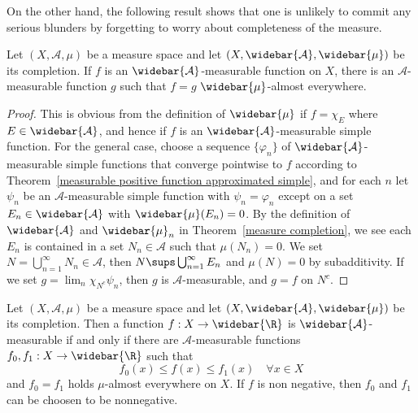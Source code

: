 On the other hand, the following result shows that one is unlikely to commit any serious blunders by forgetting to worry about completeness of the measure.
\begin{proposition}\label{measurable function completion}
Let $(X,\mathcal{A},\mu)$ be a measure space and let $(X,\widebar{\mathcal{A}},\widebar{\mu})$ be its completion. If $f$ is an $\widebar{\mathcal{A}}$-measurable function on $X$, there is an $\mathcal{A}$-measurable function
$g$ such that $f=g$ $\widebar{\mu}$-almost everywhere.
\end{proposition}
\begin{proof}
This is obvious from the definition of $\widebar{\mu}$ if $f=\chi_E$ where $E\in\widebar{\mathcal{A}}$, and hence if $f$ is an $\widebar{\mathcal{A}}$-measurable simple function. For the general case, choose a sequence $\{\varphi_n\}$ of $\widebar{\mathcal{A}}$-measurable simple functions that converge pointwise to $f$ according to Theorem~\ref{measurable positive function approximated simple}, and for each $n$ let $\psi_n$ be an $\mathcal{A}$-measurable simple function with $\psi_n=\varphi_n$ except on a set $E_n\in\widebar{\mathcal{A}}$ with $\widebar{\mu}(E_n)=0$. By the definition of $\widebar{\mathcal{A}}$ and $\widebar{\mu}_n$ in Theorem~\ref{measure completion}, we see each $E_n$ is contained in a set $N_n\in\mathcal{A}$ such that $\mu(N_n)=0$. We set $N=\bigcup_{n=1}^{\infty}N_n\in\mathcal{A}$, then $N\sups\bigcup_{n=1}^{\infty}E_n$ and $\mu(N)=0$ by subadditivity. If we set $g=\lim_n\chi_{N^c}\psi_n$, then $g$ is $\mathcal{A}$-measurable, and $g=f$ on $N^c$.
\end{proof}
\begin{proposition}\label{measurable extended value function completion}
Let $(X,\mathcal{A},\mu)$ be a measure space and let $(X,\widebar{\mathcal{A}},\widebar{\mu})$ be its completion. Then a function $f:X\to\widebar{\R}$ is $\widebar{\mathcal{A}}$-measurable if and only if there are $\mathcal{A}$-measurable functions $f_0,f_1:X\to\widebar{\R}$ such that
\[f_0(x)\leq f(x)\leq f_1(x)\quad\forall x\in X\]
and $f_0=f_1$ holds $\mu$-almost everywhere on $X$. If $f$ is non negative, then $f_0$ and $f_1$ can be choosen to be nonnegative.
\end{proposition}
